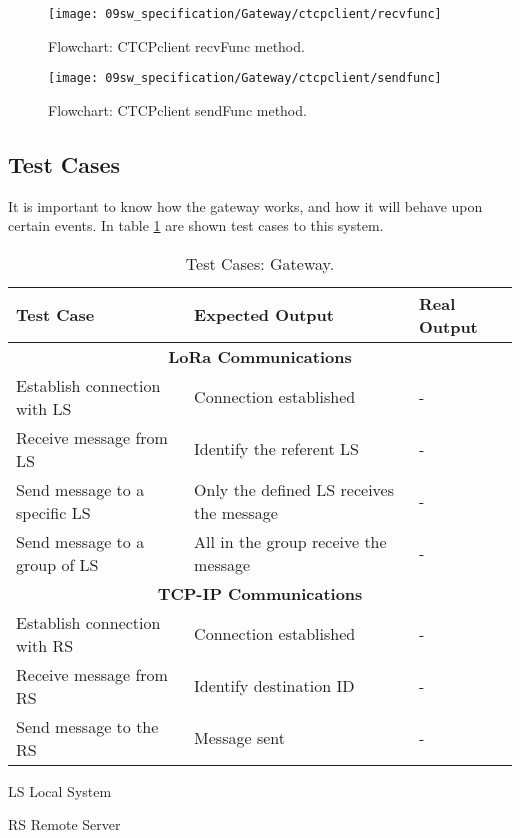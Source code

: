 \begin{figure}[H]
	\centering
	\texttt{[image: 09sw\_specification/Gateway/ctcpclient/recvfunc]}
	\caption{Flowchart: CTCPclient recvFunc method.}
	\label{fig:TCPclientrecvfunc}
\end{figure}

\begin{figure}[H]
	\centering
	\texttt{[image: 09sw\_specification/Gateway/ctcpclient/sendfunc]}
	\caption{Flowchart: CTCPclient sendFunc method.}
	\label{fig:TCPclientsendfunc}
\end{figure}

\clearpage
\subsection{Test Cases}
It is important to know how the gateway works, and how it will behave upon certain events. In table \ref{table:test_gateway} are shown test cases to this system.

\begin{table}[H]
	\centering
	\begin{threeparttable}
	\resizebox{\columnwidth}{!}
	{
		\begin{tabular}{|m{4cm}|m{5cm}||m{5cm}|}
			\hline
			\textbf{Test Case} & \textbf{Expected Output} & \textbf{Real Output}
			\\\hline\hline
			\multicolumn{3}{c}{\textbf{LoRa Communications}}\\\hline
			Establish connection with LS & Connection established & -
			\\\hline
			Receive message from LS & Identify the referent LS & -
			\\\hline
			Send message to a specific LS & Only the defined LS receives the message & -
			\\\hline
			Send message to a group of LS & All in the group receive the message & - 
			\\\hline
			
			\multicolumn{3}{c}{\textbf{TCP-IP Communications}}\\\hline
			Establish connection with RS & Connection established & -
			\\\hline
			Receive message from RS & Identify destination ID & -
			\\\hline
			Send message to the RS & Message sent & -
			\\\hline
		\end{tabular}
	}
	\begin{tablenotes}
		\small
		\item[LS]Local System
		\item[RS]Remote Server
	\end{tablenotes}
	
\end{threeparttable}	
	\caption{Test Cases: Gateway.}
	\label{table:test_gateway}
\end{table}
